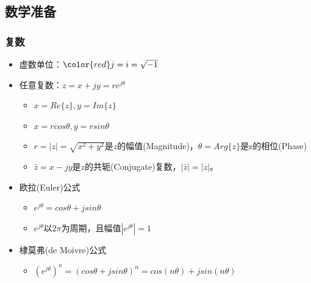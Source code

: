 \documentclass[CJKutf8,xcolor=pdftex,dvipsnames,table]{beamer}
\begin{document}
\begin{CJK*}{UTF8}{song}
  \section{数学准备}
  \begin{frame}
    \frametitle{复数} 
    \begin{itemize}
    \item 虚数单位：${\color{red}j}=i=\sqrt{-1}$
    \item 任意复数：$z=x+jy=re^{j\theta}$
        \begin{itemize}
        \item $x=Re\{z\}, y=Im\{z\}$
        \item $x=r cos\theta, y=r sin\theta$
        \item $r=|z|=\sqrt{x^2+y^2}$是$z$的幅值(Magnitude)，$\theta=Arg\{z\}$是z的相位(Phase)
        \item $\bar{z}=x-jy$是$z$的共轭(Conjugate)复数，$|\bar{z}|=|z|$。
        \end{itemize}
    \item 欧拉(Euler)公式
        \begin{itemize}
        \item $e^{j\theta}=cos\theta+jsin\theta$
        \item $e^{j\theta}$以$2\pi$为周期，且幅值$|e^{j\theta}|=1$
        \end{itemize}
    \item 棣莫弗(de Moivre)公式
        \begin{itemize}
        \item ${(e^{j\theta})}^n={(cos\theta+jsin\theta)}^n=cos(n\theta)+jsin(n\theta)$
        \end{itemize}    
    \end{itemize}
  \end{frame}  
  


\end{CJK*}
\end{document}
